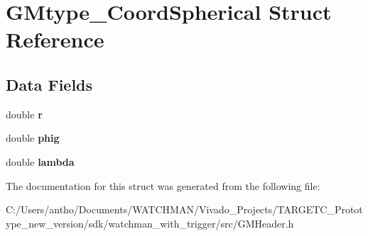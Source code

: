 \section{G\+Mtype\+\_\+\+Coord\+Spherical Struct Reference}
\label{struct_g_mtype___coord_spherical}
\subsection*{Data Fields}
\begin{DoxyCompactItemize}
\item 
\mbox{\label{struct_g_mtype___coord_spherical_a880a49112fedae68e714341a9a082fb6}} 
double {\bfseries r}
\item 
\mbox{\label{struct_g_mtype___coord_spherical_a1861a6281e1d9537931ca28d49d91d0f}} 
double {\bfseries phig}
\item 
\mbox{\label{struct_g_mtype___coord_spherical_a3db359547eed8cfd48ca821d95f577af}} 
double {\bfseries lambda}
\end{DoxyCompactItemize}


The documentation for this struct was generated from the following file\+:\begin{DoxyCompactItemize}
\item 
C\+:/\+Users/antho/\+Documents/\+W\+A\+T\+C\+H\+M\+A\+N/\+Vivado\+\_\+\+Projects/\+T\+A\+R\+G\+E\+T\+C\+\_\+\+Prototype\+\_\+new\+\_\+version/sdk/watchman\+\_\+with\+\_\+trigger/src/G\+M\+Header.\+h\end{DoxyCompactItemize}
